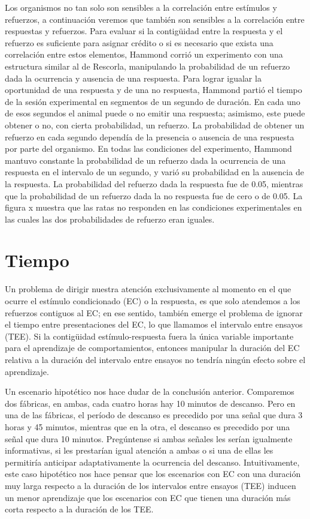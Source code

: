 \documentclass[
  letterpaper,
]{book}
\begin{document}
Los organismos no tan solo son sensibles a la correlación entre
estímulos y refuerzos, a continuación veremos que también son sensibles
a la correlación entre respuestas y refuerzos. Para evaluar si la
contigüidad entre la respuesta y el refuerzo es suficiente para asignar
crédito o si es necesario que exista una correlación entre estos
elementos, Hammond corrió un experimento con una estructura similar al
de Rescorla, manipulando la probabilidad de un refuerzo dada la
ocurrencia y ausencia de una respuesta. Para lograr igualar la
oportunidad de una respuesta y de una no respuesta, Hammond partió el
tiempo de la sesión experimental en segmentos de un segundo de duración.
En cada uno de esos segundos el animal puede o no emitir una respuesta;
asimismo, este puede obtener o no, con cierta probabilidad, un refuerzo.
La probabilidad de obtener un refuerzo en cada segundo dependía de la
presencia o ausencia de una respuesta por parte del organismo. En todas
las condiciones del experimento, Hammond mantuvo constante la
probabilidad de un refuerzo dada la ocurrencia de una respuesta en el
intervalo de un segundo, y varió su probabilidad en la ausencia de la
respuesta. La probabilidad del refuerzo dada la respuesta fue de 0.05,
mientras que la probabilidad de un refuerzo dada la no respuesta fue de
cero o de 0.05. La figura x muestra que las ratas no responden en las
condiciones experimentales en las cuales las dos probabilidades de
refuerzo eran iguales.

\section{Tiempo}\label{tiempo}

Un problema de dirigir nuestra atención exclusivamente al momento en el
que ocurre el estímulo condicionado (EC) o la respuesta, es que solo
atendemos a los refuerzos contiguos al EC; en ese sentido, también
emerge el problema de ignorar el tiempo entre presentaciones del EC, lo
que llamamos el intervalo entre ensayos (TEE). Si la contigüidad
estímulo-respuesta fuera la única variable importante para el
aprendizaje de comportamientos, entonces manipular la duración del EC
relativa a la duración del intervalo entre ensayos no tendría ningún
efecto sobre el aprendizaje.

Un escenario hipotético nos hace dudar de la conclusión anterior.
Comparemos dos fábricas, en ambas, cada cuatro horas hay 10 minutos de
descanso. Pero en una de las fábricas, el período de descanso es
precedido por una señal que dura 3 horas y 45 minutos, mientras que en
la otra, el descanso es precedido por una señal que dura 10 minutos.
Pregúntense si ambas señales les serían igualmente informativas, si les
prestarían igual atención a ambas o si una de ellas les permitiría
anticipar adaptativamente la ocurrencia del descanso. Intuitivamente,
este caso hipotético nos hace pensar que los escenarios con EC con una
duración muy larga respecto a la duración de los intervalos entre
ensayos (TEE) inducen un menor aprendizaje que los escenarios con EC que
tienen una duración más corta respecto a la duración de los TEE.
\end{document}
